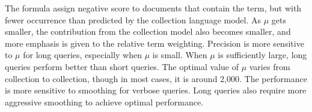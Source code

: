 The formula assign negative score to documents that contain the term, but with fewer occurrence than predicted by the collection language model. As $ \mu $ gets smaller, the contribution from the collection model also becomes smaller, and more emphasis is given to the relative term weighting. Precision is more sensitive to $ \mu $ for long queries, especially when $ \mu $ is small. When $ \mu $ is sufficiently large, long queries perform better than short queries. The optimal value of $ \mu $ varies from collection to collection, though in most cases, it is around 2,000. The performance is more sensitive to smoothing for verbose queries. Long queries also require more aggressive smoothing to achieve optimal performance. 
